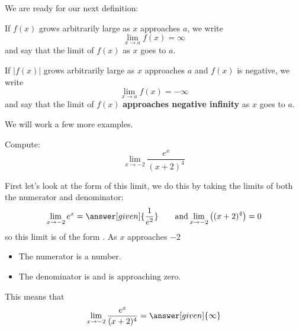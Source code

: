 \documentclass{ximera}
\begin{document}
We are ready for our next definition:

\begin{definition}
If $f(x)$ grows arbitrarily large as $x$ approaches $a$, we write
\[
\lim_{x\to a} f(x) = \infty
\]
and say that the limit of $f(x)$  as $x$
goes to $a$.

If $|f(x)|$ grows arbitrarily large as $x$ approaches $a$ and $f(x)$ is
negative, we write
\[
\lim_{x\to a} f(x) = -\infty
\]
and say that the limit of $f(x)$ \textbf{approaches negative infinity}
as $x$ goes to $a$.
\end{definition}

We will work a few more examples.

\begin{example}
  Compute:
  \[
  \lim_{x\to -2} \frac{e^x}{(x+2)^4}
  \]
  \begin{explanation}
    First let's look at the form of this limit, we do this by taking the limits of both the numerator and denominator:
    \[
    \lim_{x\to -2} e^x = \answer[given]{\frac{1}{e^2}}\qquad\text{and}\lim_{x\to-2}\left((x+2)^4\right) = 0
    \]
    so this limit is of the form \numOverZero.  As $x$ approaches $-2$
    \begin{itemize}
    \item The numerator is a  number. 
    \item The denominator is  and is approaching zero.
    \end{itemize}
    This means that
    \[
    \lim_{x\to -2} \frac{e^x}{(x+2)^4} = \answer[given]{\infty}
    \]
  \end{explanation}
\end{example}
\end{document}
